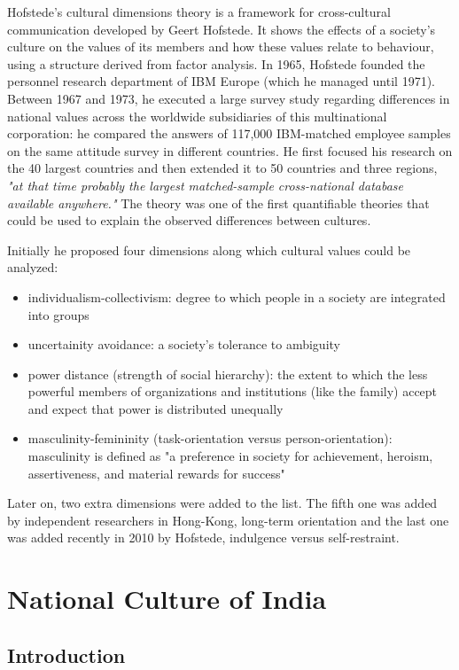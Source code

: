 \documentclass[12pt]{article}
\begin{document}
Hofstede's cultural dimensions theory is a framework for cross-cultural communication developed by Geert Hofstede. It shows the effects of a society's culture on the values of its members and how these values relate to behaviour, using a structure derived from factor analysis. In 1965, Hofstede founded the personnel research department of IBM Europe (which he managed until 1971). Between 1967 and 1973, he executed a large survey study regarding differences in national values across the worldwide subsidiaries of this multinational corporation: he compared the answers of 117,000 IBM-matched employee samples on the same attitude survey in different countries. He first focused his research on the 40 largest countries and then extended it to 50 countries and three regions, \textit{"at that time probably the largest matched-sample cross-national database available anywhere."} The theory was one of the first quantifiable theories that could be used to explain the observed differences between cultures.

Initially he proposed four dimensions along which cultural values could be analyzed: 
\begin{itemize}
    \item individualism-collectivism: degree to which people in a society are integrated into groups
    \item uncertainity avoidance: a society's tolerance to ambiguity
    \item power distance (strength of social hierarchy): the extent to which the less powerful members of organizations and institutions (like the family) accept and expect that power is distributed unequally
    \item masculinity-femininity (task-orientation versus person-orientation): masculinity is defined as "a preference in society for achievement, heroism, assertiveness, and material rewards for success"
\end{itemize}
Later on, two extra dimensions were added to the list. The fifth one was added by independent researchers in Hong-Kong, long-term orientation and the last one was added recently in 2010 by Hofstede, indulgence versus self-restraint.

\section{National Culture of India}

\subsection{Introduction}
\end{document}
